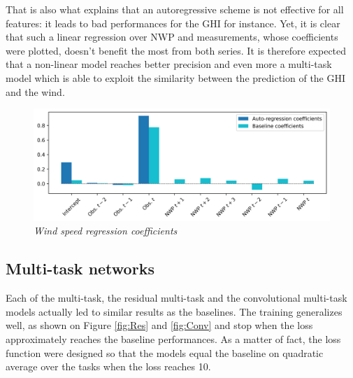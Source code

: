 \documentclass{article}
\newcommand{\saut}{\vspace{10px}}
\begin{document}
\saut

That is also what explains that an autoregressive scheme
is not effective for all features: it leads to bad performances for the GHI
for instance. Yet, it is clear that such a linear regression over NWP and measurements, whose coefficients were
plotted, doesn't benefit the most from both series. It is therefore expected that a non-linear model reaches
better precision and even more a multi-task model which is able to exploit the similarity between the prediction of
the GHI and the wind.


\begin{figure}[H]
    \centering
    \includegraphics[width=\linewidth]{img/coef.png}
    \caption{\textit{Wind speed regression coefficients}}
    \label{fig:Fig. 6}
\end{figure}

\subsection*{Multi-task networks}

Each of the multi-task, the residual multi-task and the convolutional multi-task models actually
led to similar results as the baselines. The training generalizes well,
as shown on Figure \ref{fig:Res} and \ref{fig:Conv} and stop
when the loss approximately reaches the baseline performances.
As a matter of fact, the loss function were designed so that the models equal the baseline on quadratic average
over the tasks when the loss reaches 10.
\end{document}
